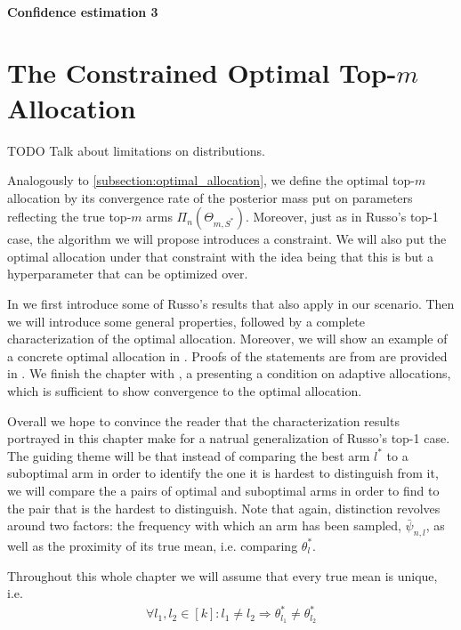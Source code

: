 \subsubsection{Confidence estimation 3}


\chapter{The Constrained Optimal Top-$m$ Allocation}

TODO Talk about limitations on distributions.

Analogously to \ref{subsection:optimal_allocation}, we define the optimal top-$m$ allocation by its convergence rate of the posterior mass put on parameters reflecting the true top-$m$ arms $\Pi_n(\Theta_{m, S^*})$. Moreover, just as in Russo's top-1 case, the algorithm we will propose introduces a constraint. We will also put the optimal allocation under that constraint with the idea being that this is but a hyperparameter that can be optimized over.

In  we first introduce some of Russo's results that also apply in our scenario. Then we will introduce some general properties, followed by a complete characterization of the optimal allocation. Moreover, we will show an example of a concrete optimal allocation in . Proofs of the statements are from  are provided in . We finish the chapter with , a presenting a condition on adaptive allocations, which is sufficient to show convergence to the optimal allocation.

Overall we hope to convince the reader that the characterization results portrayed in this chapter make for a natrual generalization of Russo's top-1 case. The guiding theme will be that instead of comparing the best arm $l^*$ to a suboptimal arm in order to identify the one it is hardest to distinguish from it, we will compare the a pairs of optimal and suboptimal arms in order to find to the pair that is the hardest to distinguish. Note that again, distinction revolves around two factors: the frequency with which an arm has been sampled, $\bar{\psi}_{n, l}$, as well as the proximity of its true mean, i.e. comparing $\theta^*_l$.

Throughout this whole chapter we will assume that every true mean is unique, i.e.
\begin{align}
  \forall l_1, l_2 \in [k]: l_1 \neq l_2 \Rightarrow \theta^*_{l_1} \neq \theta^*_{l_2}
\end{align}

